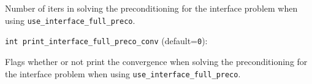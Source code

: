 Number of iters in solving the preconditioning for the 
interface problem when using \verb+use_interface_full_preco+. 

\item\verb+int print_interface_full_preco_conv+ {\rm(default=\verb|0|)}:

Flags whether or not print the convergence when solving the
preconditioning for the interface problem when using
\verb+use_interface_full_preco+.

